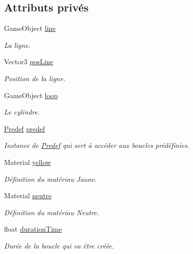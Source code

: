 \subsection*{Attributs privés}
\begin{DoxyCompactItemize}
\item 
Game\+Object \hyperlink{class_music_a1507118c48dd86cf0cc02e35e9a878d2}{line}
\begin{DoxyCompactList}\small\item\em La ligne. \end{DoxyCompactList}\item 
Vector3 \hyperlink{class_music_a8dee10ad61d1260dc55195c7a7c50d7c}{pos\+Line}
\begin{DoxyCompactList}\small\item\em Position de la ligne. \end{DoxyCompactList}\item 
Game\+Object \hyperlink{class_music_ad8b992250bd9ff84988adc7c0091c321}{loop}
\begin{DoxyCompactList}\small\item\em Le cylindre. \end{DoxyCompactList}\item 
\hyperlink{class_predef}{Predef} \hyperlink{class_music_a23d19ec4b266573443920e3dacc9bd93}{predef}
\begin{DoxyCompactList}\small\item\em Instance de \hyperlink{class_predef}{Predef} qui sert à accéder aux boucles prédéfinies. \end{DoxyCompactList}\item 
Material \hyperlink{class_music_acf7deb58e516a37db39d3c9883d6034e}{yellow}
\begin{DoxyCompactList}\small\item\em Définition du matériau Jaune. \end{DoxyCompactList}\item 
Material \hyperlink{class_music_ac4412a8635c49f90692e3683931c0343}{neutre}
\begin{DoxyCompactList}\small\item\em Définition du matériau Neutre. \end{DoxyCompactList}\item 
float \hyperlink{class_music_ae4014f55d10343673bbf00004ebaaf31}{duration\+Time}
\begin{DoxyCompactList}\small\item\em Durée de la boucle qui va être créée. \end{DoxyCompactList}\item 

\end{DoxyCompactItemize}
